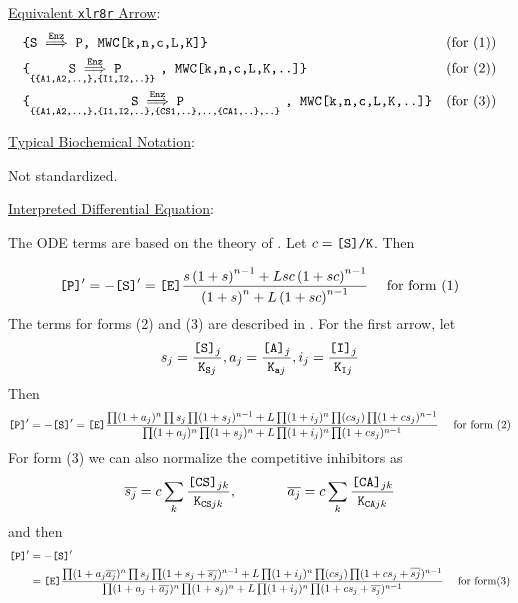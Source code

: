 \underline{Equivalent {\tt xlr8r} Arrow}: 
\begin{align*}
&\text{\tt{\{S}} \overset{\text{\tt{Enz}}}{\implies} \text{\tt{P, MWC[k,n,c,L,K]}} \text{\tt{\}}}&\text{(for (1))}\\
&\text{\tt{\{}} \underset{\text{\tt \{\{A1,A2,..,\},\{I1,I2,..\}\} }}{ {\text{\tt{S}} \overset{\text{\tt{Enz}}}{\implies} \text{\tt{P}}}} \text{\tt{, MWC[k,n,c,L,K,..]}} \text{\tt{\}}}&\text{(for (2))}\\
&\text{\tt{\{}} \underset{\text{\tt \{\{A1,A2,..,\},\{I1,I2,..\},\{CS1,..\},..,\{CA1,..\},..\} }}{ {\text{\tt{S}} \overset{\text{\tt{Enz}}}{\implies} \text{\tt{P}}}} \text{\tt{, MWC[k,n,c,L,K,..]}} \text{\tt{\}}}
&\text{(for (3))}
\end{align*}

\underline{Typical Biochemical Notation}: 

Not standardized. 

\underline{Interpreted Differential Equation}:

The ODE terms are based on the theory of \cite{MWC}. Let $c=\text{\tt{[S]/K}}$. Then 

\begin{align*}
\text{\tt{[P]}}' = -\text{\tt{[S]}}' &= \text{\tt{[E]}}\dfrac{{s \left(1 + s\right)^{n-1}} + {L s c \left(1 + s c\right)^{n-1}}}
              {\left(1 + s\right)^{n} + L \left(1 + {s c}\right)^{n-1}}
              &\text{ for form (1)}
\end{align*}
The terms for forms (2) and (3) are described in \cite{GMWC}. For the first arrow, let 
\begin{align*}
s_j = \dfrac{\text{\tt{[S]}}_j}{\text{\tt{K}}_{\text{\tt{S}}j}}, 
a_j = \dfrac{\text{\tt{[A]}}_j}{\text{\tt{K}}_{\text{\tt{a}}j}}, 
i_j = \dfrac{\text{\tt{[I]}}_j}{\text{\tt{K}}_{\text{\tt{I}}j}}
\end{align*}
Then
\begin{align*}
\text{\tt{[P]}}' = -\text{\tt{[S]}}' &= \text{\tt{[E]}}\dfrac{
{\prod(1+a_j)^n \prod s_j \prod(1 + s_j)^{n-1}} + {L \prod(1+i_j)^n \prod (cs_j ) \prod (1 + c s_j)^{n-1}}}
              {\prod(1+a_j)^n\prod (1 + s_j)^{n} + L \prod(1+i_j)^n\prod(1 + {c s_j})^{n-1}}
              &\text{ for form (2)}
\end{align*}
For form (3) we can also normalize the competitive inhibitors as
\begin{align*}
&\overline{s_j} = c \sum_k \dfrac{\text{\tt{[CS]}}_{jk}}{\text{\tt{K}}_{\text{\tt{CS}}jk}},\hspace{.5in}
\overline{a_j} = c \sum_k \dfrac{\text{\tt{[CA]}}_{jk}}{\text{\tt{K}}_{\text{\tt{CA}}jk}}\\
\end{align*}
and then
\begin{align*}
\text{\tt{[P]}}' &= -\text{\tt{[S]}}' \\
&= \text{\tt{[E]}}\dfrac{
{\prod(1+a_j\overline{a_j})^n \prod s_j \prod(1 + s_j+\overline{s_j})^{n-1}} + {L \prod(1+i_j)^n \prod (cs_j ) \prod (1 + c s_j + \overline{sj})^{n-1}}}
              {\prod(1+a_j+\overline{a_j})^n\prod (1 + s_j)^{n} + L \prod(1+i_j)^n\prod(1 + {c s_j} + \overline{s_j})^{n-1}}
              &\text{ for form(3)}
\end{align*}

